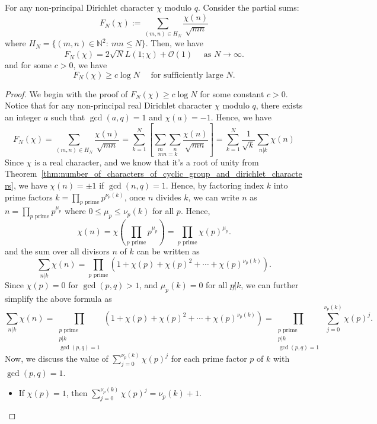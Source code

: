 \documentclass{elegantbook}
\begin{document}
\begin{lemma} \label{lem:lattice_point_count_for_dirichlet_characters}
  For any non-principal Dirichlet character \(\chi\) modulo \(q\). Consider the partial sums:
  \[
    F_N(\chi) := \sum_{(m,n)\in H_N}\frac{\chi(n)}{\sqrt{mn}}
  \]
  where $H_N=\{(m,n)\in\mathbb{N}^2:\ mn\le N\}$. Then, we have
  \[
    F_N(\chi) = 2\sqrt{N}L(1;\chi) + \mathcal{O}(1) \quad \text{ as } N \to \infty.
  \]
  and for some $c>0$, we have
  \[
    F_N(\chi) \geq c \log N \quad \text{ for sufficiently large } N.
  \]
\end{lemma}

\begin{proof}
  We begin with the proof of $F_N(\chi) \geq c\log N$ for some constant \(c > 0\). Notice that for any non-principal real Dirichlet character \(\chi\) modulo \(q\), there exists an integer \(a\) such that \(\gcd(a,q)=1\) and \(\chi(a) = -1\). Hence, we have
  \[
    F_N(\chi) = \sum_{(m,n)\in H_N} \frac{\chi(n)}{\sqrt{mn}} = \sum_{k=1}^N\left[\underset{mn=k}{\sum_{m}\sum_{n}}\frac{\chi(n)}{\sqrt{mn}}\right]=\sum_{k=1}^N \frac{1}{\sqrt{k}}\sum_{n|k}\chi(n)
  \]
  Since \(\chi\) is a real character, and we know that it's a root of unity from Theorem~\ref{thm:number_of_characters_of_cyclic_group_and_dirichlet_characters}, we have \(\chi(n)=\pm 1\) if $\gcd(n,q)=1$. Hence, by factoring index $k$ into prime factors $k=\prod_{p\text{ prime}} p^{\nu_p(k)}$, once $n$ divides $k$, we can write $n$ as $n=\prod_{p\text{ prime}} p^{\mu_p}$ where $0\le \mu_p \le \nu_p(k)$ for all $p$. Hence,
  \[
    \chi(n) = \chi\left(\prod_{p\text{ prime}} p^{\mu_p}\right) = \prod_{p\text{ prime}} \chi(p)^{\mu_p}.
  \]
  and the sum over all divisors $n$ of $k$ can be written as
  \[
    \sum_{n|k}\chi(n) = \prod_{p\text{ prime}} \left(1 + \chi(p) + \chi(p)^2 + \cdots + \chi(p)^{\nu_p(k)}\right).
  \]
  Since $\chi(p) = 0$ for $\gcd(p,q)>1$, and $\mu_p(k)=0$ for all $p \not| k$, we can further simplify the above formula as
  \[
    \sum_{n|k}\chi(n) = \prod_{\substack{p\text{ prime} \\ p|k \\ \gcd(p,q)=1}} \left(1 + \chi(p) + \chi(p)^2 + \cdots + \chi(p)^{\nu_p(k)}\right) = \prod_{\substack{p\text{ prime} \\ p|k \\ \gcd(p,q)=1}} \sum_{j=0}^{\nu_p(k)} \chi(p)^j.
  \]
  Now, we discuss the value of $\sum_{j=0}^{\nu_p(k)} \chi(p)^j$ for each prime factor \(p\) of \(k\) with \(\gcd(p,q)=1\).
  \begin{itemize}
    \item If $\chi(p) = 1$, then $\sum_{j=0}^{\nu_p(k)} \chi(p)^j = \nu_p(k) + 1$.

\end{itemize}
\end{proof}
\end{document}
